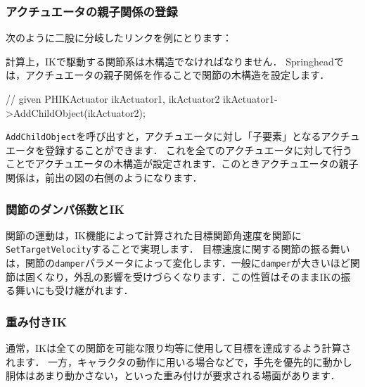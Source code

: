 \KLUDGE %
\KLUDGE %
\subsubsection*{アクチュエータの親子関係の登録}

\KLUDGE 次のように二股に分岐したリンクを例にとります：

\begin{center}
\end{center}

\KLUDGE 計算上，IKで駆動する関節系は木構造でなければなりません．
Springheadでは，アクチュエータの親子関係を作ることで関節の木構造を設定します．

\begin{sourcecode}
// given PHIKActuator ikActuator1, ikActuator2
ikActuator1->AddChildObject(ikActuator2);
\end{sourcecode}
\texttt{AddChildObject}を呼び出すと，アクチュエータに対し「子要素」となるアクチュエータを登録することができます．
\KLUDGE これを全てのアクチュエータに対して行うことでアクチュエータの木構造が設定されます．このときアクチュエータの親子関係は，前出の図の右側のようになります．


\KLUDGE %
\KLUDGE %
\subsubsection*{関節のダンパ係数とIK}

\KLUDGE %

\KLUDGE 関節の運動は，IK機能によって計算された目標関節角速度を関節に\texttt{SetTargetVelocity}することで実現します．
\KLUDGE 目標速度に関する関節の振る舞いは，関節の\texttt{damper}パラメータによって変化します．一般に\texttt{damper}が大きいほど関節は固くなり，外乱の影響を受けづらくなります．この性質はそのままIKの振る舞いにも受け継がれます．


\KLUDGE %
\KLUDGE %
\subsubsection*{重み付きIK}

\KLUDGE 通常，IKは全ての関節を可能な限り均等に使用して目標を達成するよう計算されます．
\KLUDGE 一方，キャラクタの動作に用いる場合などで，手先を優先的に動かし胴体はあまり動かさない，といった重み付けが要求される場面があります．


